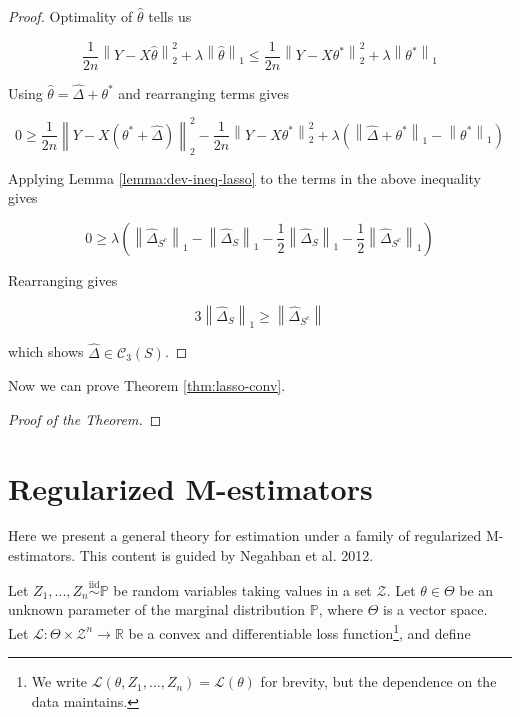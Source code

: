 \documentclass{article}
\newcommand{\R}{\mathbb{R}}
\newcommand{\bbP}{\mathbb{P}}
\newcommand{\cC}{\mathcal{C}}
\newcommand{\cL}{\mathcal{L}}
\newcommand{\cZ}{\mathcal{Z}}
\newcommand{\iid}{\overset{\textrm{iid}}{\sim}}
\newcommand{\norm}[1]{\left\|#1\right\|}
\begin{document}
\begin{proof}
  Optimality of $\hat{\theta}$ tells us

  $$\frac{1}{2n}\norm{Y - X\hat{\theta}}_{2}^{2} + \lambda\norm{\hat{\theta}}_{1} \leq \frac{1}{2n}\norm{Y - X\theta^{*}}_{2}^{2} + \lambda\norm{\theta^{*}}_{1}$$

  Using $\hat{\theta} = \hat{\Delta} + \theta^{*}$ and rearranging terms gives

$$0 \geq \frac{1}{2n}\norm{Y - X(\theta^{*} + \hat{\Delta})}_{2}^{2} - \frac{1}{2n}\norm{Y - X\theta^{*}}_{2}^{2} + \lambda(\norm{\hat{\Delta} + \theta^{*}}_{1} - \norm{\theta^{*}}_{1})$$

Applying Lemma \ref{lemma:dev-ineq-lasso} to the terms in the above inequality gives

$$0 \geq \lambda\left(\norm{\hat{\Delta}_{S^{c}}}_{1} - \norm{\hat{\Delta}_{S}}_{1} - \frac12\norm{\hat{\Delta}_{S}}_{1} - \frac12\norm{\hat{\Delta}_{S^{c}}}_{1}\right)$$

Rearranging gives

$$3\norm{\hat{\Delta}_{S}}_{1} \geq \norm{\hat{\Delta}_{S^{c}}}$$

which shows $\hat{\Delta} \in \cC_{3}(S)$.

\end{proof}

Now we can prove Theorem \ref{thm:lasso-conv}.

\begin{proof}[Proof of the Theorem]


\end{proof}





















\section{Regularized M-estimators}

Here we present a general theory for estimation under a family of regularized M-estimators. This content is guided by Negahban et al. 2012.

Let $Z_{1}, ..., Z_{n} \iid \bbP$ be random variables taking values in a set $\cZ$. Let $\theta \in \Theta$ be an unknown parameter of the marginal distribution $\bbP$, where $\Theta$ is a vector space. Let $\cL : \Theta \times \cZ^{n} \rightarrow \R$ be a convex and differentiable loss function\footnote{We write $\cL(\theta, Z_{1}, ..., Z_{n}) = \cL(\theta)$ for brevity, but the dependence on the data maintains.}, and define
\end{document}
